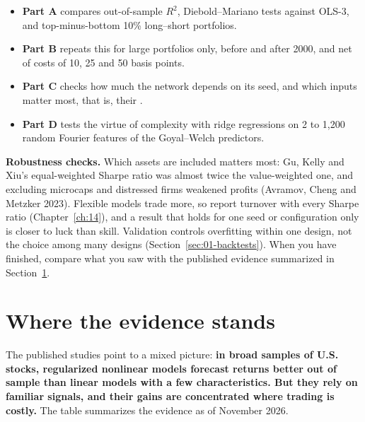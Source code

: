 \begin{itemize}
  \item \textbf{Part A} compares out-of-sample $R^2$, Diebold--Mariano tests against OLS-3, and top-minus-bottom 10\% long--short portfolios.
  \item \textbf{Part B} repeats this for large portfolios only, before and after 2000, and net of costs of 10, 25 and 50 basis points.
  \item \textbf{Part C} checks how much the network depends on its seed, and which inputs matter most, that is, their .
  \item \textbf{Part D} tests the virtue of complexity with ridge regressions on 2 to 1,200 random Fourier features of the Goyal--Welch predictors.
\end{itemize}

\label{sec:20-stress}
\textbf{Robustness checks.} Which assets are included matters most: Gu, Kelly and Xiu's equal-weighted Sharpe ratio was almost twice the value-weighted one, and excluding microcaps and distressed firms weakened profits (Avramov, Cheng and Metzker 2023). Flexible models trade more, so report turnover with every Sharpe ratio (Chapter~\ref{ch:14}), and a result that holds for one seed or configuration only is closer to luck than skill. Validation controls overfitting within one design, not the choice among many designs (Section~\ref{sec:01-backtests}). When you have finished, compare what you saw with the published evidence summarized in Section~\ref{sec:20-verdict}.

\section{Where the evidence stands}
\label{sec:20-verdict}

The published studies point to a mixed picture: \textbf{in broad samples of U.S. stocks, regularized nonlinear models forecast returns better out of sample than linear models with a few characteristics. But they rely on familiar signals, and their gains are concentrated where trading is costly.} The table summarizes the evidence as of November 2026.


